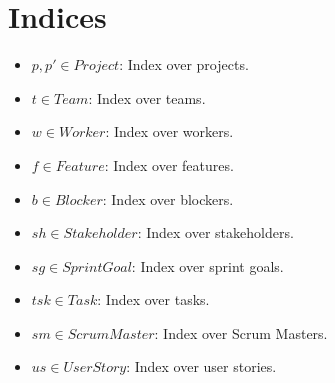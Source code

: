 \documentclass[11pt]{article}
\begin{document}
\section{Indices}
\begin{itemize}
    \item $p, p' \in Project$: Index over projects.
    \item $t \in Team$: Index over teams.
    \item $w \in Worker$: Index over workers.
    \item $f \in Feature$: Index over features.
    \item $b \in Blocker$: Index over blockers.
    \item $sh \in Stakeholder$: Index over stakeholders.
    \item $sg \in SprintGoal$: Index over sprint goals.
    \item $tsk \in Task$: Index over tasks.
    \item $sm \in ScrumMaster$: Index over Scrum Masters.
    \item $us \in UserStory$: Index over user stories.
\end{itemize}
\end{document}
